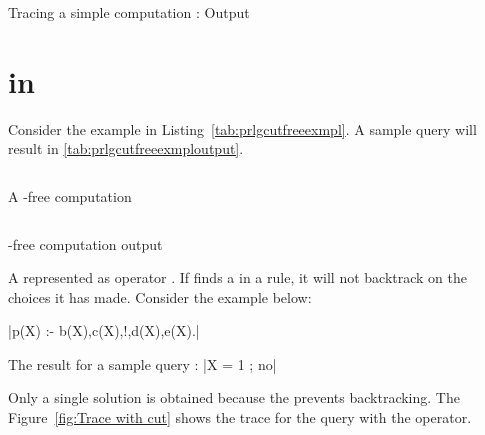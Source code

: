 \documentclass[thesis-solanki.tex]{subfiles}
\begin{document}
\begin{code-list}[H]
  \begin{singlespace}
    \inputminted[linenos, firstline=7]{prolog}{prologprogramtrace.pl}
  \end{singlespace}
  \caption{Tracing a simple  computation \cite{Sterling:1994:APA:175753} : Output}
\label{tab:prlgprgrmtrceop}
\end{code-list}

\section{ in }
Consider the example in Listing~\ref{tab:prlgcutfreeexmpl}.
A sample query  will result in \ref{tab:prlgcutfreeexmploutput}. 

\begin{code-list}[H]
  \begin{singlespace}
    \inputminted[linenos]{prolog}{prlgcutfreeexmpl.pl}
  \end{singlespace}
  \caption{A -free  computation \cite{website:cutprologunionedu}}
\label{tab:prlgcutfreeexmpl}
\end{code-list}

\begin{code-list}[H]
  \begin{singlespace}
    \inputminted[linenos]{prolog}{prlgcutfreeexmploutput.pl}
  \end{singlespace}
  \caption{-free  computation output\cite{website:cutprologunionedu}}
\label{tab:prlgcutfreeexmploutput}
\end{code-list}

A  represented as \prologConstruct{!}
operator \cite{website:prologcut}.
If  finds a  in a rule, it will not backtrack on the choices it has made.
Consider the example below:

|p(X) :- b(X),c(X),!,d(X),e(X).|

\noindent The result for a sample query :
|X = 1 ; no|

Only a single solution is obtained because the  prevents backtracking. The Figure~\ref{fig:Trace with cut} shows the 
trace for the query with the  operator.
\end{document}
